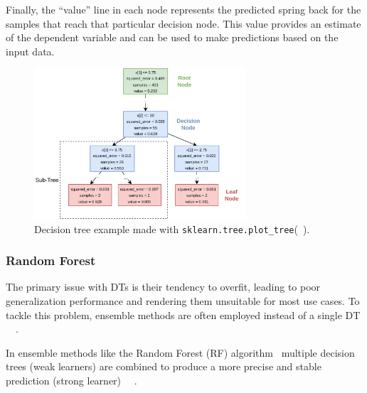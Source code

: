 Finally, the ``value'' line in each node represents the predicted spring back for the samples that reach that
particular decision node.
This value provides an estimate of the dependent variable and can be used to make predictions based on the input data.

\begin{figure}[]
    \begin{tcolorbox}[arc=0pt,boxrule=0.5pt]
        \centering
        \includegraphics[width=0.7\textwidth]{chap4/images/decision_tree_example}
    \end{tcolorbox}
    \caption{Decision tree example made with \texttt{sklearn.tree.plot\_tree}(~\cite{scikit-learn}).
    }
    \label{fig:dt-example}
\end{figure}

\subsubsection{Random Forest}\label{subsubsec:random-forests}
The primary issue with DTs is their tendency to overfit, leading to poor generalization
performance and rendering them unsuitable for most use cases.
To tackle this problem, ensemble methods are often employed instead of a single
DT
~\cite[p. 83]{muller2016introduction}~\cite[p. 251]{liu2012new}.

In ensemble methods like the Random Forest (RF) algorithm~\cite[]{breiman2001random} multiple decision
trees (weak learners) are combined to produce a more precise and stable prediction (strong learner)
~\cite[p. 24]{awad2015efficient}~\cite[pp. 340]{gareth2013introduction}.

